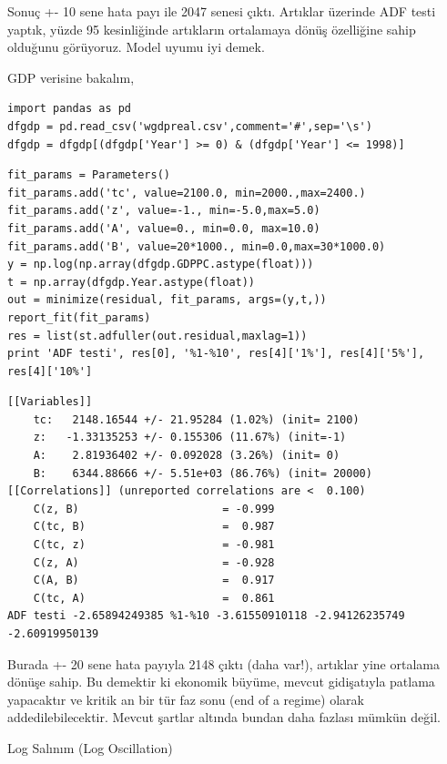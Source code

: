 \documentclass[12pt,fleqn]{article}\usepackage{../../common}
\begin{document}
Sonuç +- 10 sene hata payı ile 2047 senesi çıktı. Artıklar üzerinde ADF
testi yaptık, yüzde 95 kesinliğinde artıkların ortalamaya dönüş özelliğine
sahip olduğunu görüyoruz. Model uyumu iyi demek. 

GDP verisine bakalım,

\begin{verbatim}
import pandas as pd
dfgdp = pd.read_csv('wgdpreal.csv',comment='#',sep='\s')
dfgdp = dfgdp[(dfgdp['Year'] >= 0) & (dfgdp['Year'] <= 1998)]
\end{verbatim}

\begin{verbatim}
fit_params = Parameters()
fit_params.add('tc', value=2100.0, min=2000.,max=2400.)
fit_params.add('z', value=-1., min=-5.0,max=5.0)
fit_params.add('A', value=0., min=0.0, max=10.0)
fit_params.add('B', value=20*1000., min=0.0,max=30*1000.0)
y = np.log(np.array(dfgdp.GDPPC.astype(float)))
t = np.array(dfgdp.Year.astype(float))
out = minimize(residual, fit_params, args=(y,t,))
report_fit(fit_params)
res = list(st.adfuller(out.residual,maxlag=1))
print 'ADF testi', res[0], '%1-%10', res[4]['1%'], res[4]['5%'], res[4]['10%']
\end{verbatim}

\begin{verbatim}
[[Variables]]
    tc:   2148.16544 +/- 21.95284 (1.02%) (init= 2100)
    z:   -1.33135253 +/- 0.155306 (11.67%) (init=-1)
    A:    2.81936402 +/- 0.092028 (3.26%) (init= 0)
    B:    6344.88666 +/- 5.51e+03 (86.76%) (init= 20000)
[[Correlations]] (unreported correlations are <  0.100)
    C(z, B)                      = -0.999 
    C(tc, B)                     =  0.987 
    C(tc, z)                     = -0.981 
    C(z, A)                      = -0.928 
    C(A, B)                      =  0.917 
    C(tc, A)                     =  0.861 
ADF testi -2.65894249385 %1-%10 -3.61550910118 -2.94126235749 -2.60919950139
\end{verbatim}

Burada +- 20 sene hata payıyla 2148 çıktı (daha var!), artıklar yine
ortalama dönüşe sahip. Bu demektir ki ekonomik büyüme, mevcut gidişatıyla
patlama yapacaktır ve kritik an bir tür faz sonu (end of a regime) olarak
addedilebilecektir. Mevcut şartlar altında bundan daha fazlası mümkün değil.

Log Salınım (Log Oscillation)
\end{document}
